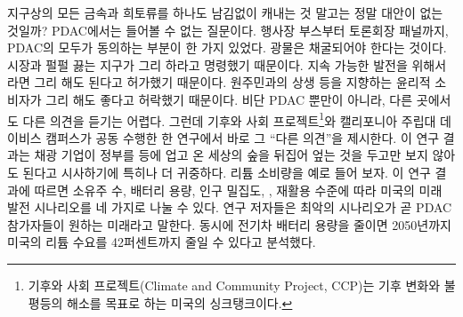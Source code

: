 \documentclass{translation}
\begin{document}
지구상의 모든 금속과 희토류를 하나도 남김없이 캐내는 것 말고는 정말 대안이 없는 것일까?
PDAC에서는 들어볼 수 없는 질문이다.
행사장 부스부터 토론회장 패널까지, PDAC의 모두가 동의하는 부분이 한 가지 있었다.
광물은 채굴되어야 한다는 것이다.
시장과 펄펄 끓는 지구가 그리 하라고 명령했기 때문이다.
지속 가능한 발전을 위해서라면 그리 해도 된다고 허가했기 때문이다.
원주민과의 상생 등을 지향하는 윤리적 소비자가 그리 해도 좋다고 허락했기 때문이다.
비단 PDAC 뿐만이 아니라, 다른 곳에서도 다른 의견을 듣기는 어렵다.
그런데 기후와 사회 프로젝트\footnote{기후와 사회 프로젝트(Climate and Community Project, CCP)는 기후 변화와 불평등의 해소를 목표로 하는 미국의 싱크탱크이다.}와 캘리포니아 주립대 데이비스 캠퍼스가 공동 수행한 한 연구에서 바로 그 ``다른 의견''을 제시한다.
이 연구 결과는 채광 기업이 정부를 등에 업고 온 세상의 숲을 뒤집어 엎는 것을 두고만 보지 않아도 된다고 시사하기에 특히나 더 귀중하다.
리튬 소비량을 예로 들어 보자.
이 연구 결과에 따르면  소유주 수,  배터리 용량,  인구 밀집도, ,  재활용 수준에 따라 미국의 미래 발전 시나리오를 네 가지로 나눌 수 있다.
연구 저자들은 최악의 시나리오가 곧 PDAC 참가자들이 원하는 미래라고 말한다.
동시에 전기차 배터리 용량을 줄이면 2050년까지 미국의 리튬 수요를 42퍼센트까지 줄일 수 있다고 분석했다.
\end{document}
